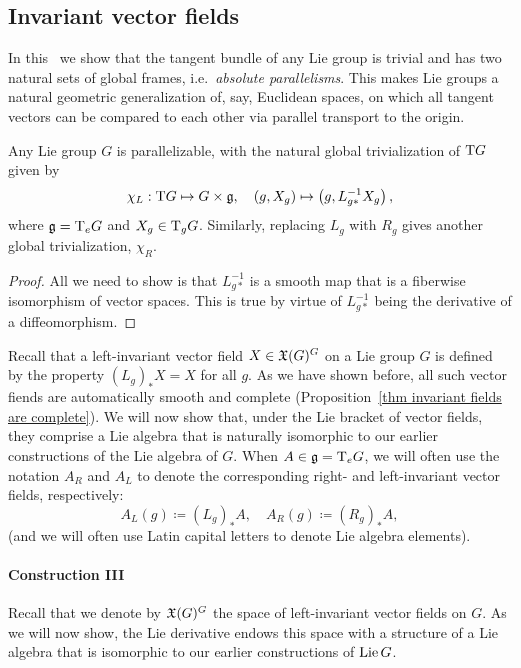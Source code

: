 \subsection{Invariant vector fields}

In this \subsect\ we show that the tangent bundle of any Lie group is trivial and has two natural sets of global frames, i.e.\ \emph{absolute parallelisms}. This makes Lie groups a natural geometric generalization of, say, Euclidean spaces, on which all tangent vectors can be compared to each other via parallel transport to the origin.

\begin{prop}
    Any Lie group $G$ is parallelizable, with the natural global trivialization of $\mathrm{T} G$ given by
    \[\chi_L:\mathrm{T} G\mapsto G\times \mathfrak{g},\quad (g,X_g)\mapsto \left(g, L_{g\ast }^{-1}X_g\right),\]
    where $\mathfrak{g}=\mathrm{T}_e G$ and $X_g\in \mathrm{T}_gG$. Similarly, replacing $L_g$ with $R_g$ gives another global trivialization, $\chi_R$.
\end{prop}
\begin{proof}
    All we need to show is that $L_{g\ast}^{-1}$ is a smooth map that is a fiberwise isomorphism of vector spaces. This is true by virtue of $L_{g\ast}^{-1}$ being the derivative of a diffeomorphism.
\end{proof}

Recall that a left-invariant vector field $X\in\mathfrak{X}(G)^G$ on a Lie group $G$ is defined by the property $(L_g)_\ast X=X$ for all $g$. As we have shown before, all such vector fiends are automatically smooth and complete (Proposition~\ref{thm invariant fields are complete}). We will now show that, under the Lie bracket of vector fields, they comprise a Lie algebra that is naturally isomorphic to our earlier constructions of the Lie algebra of $G$. When $A\in\mathfrak{g}=\mathrm{T}_eG$, we will often use the notation $A_R$ and $A_L$ to denote the corresponding right- and left-invariant vector fields, respectively:
\[A_L(g)\coloneqq (L_g)_\ast A,\quad A_R(g)\coloneqq (R_g)_\ast A,\]
(and we will often use Latin capital letters to denote Lie algebra elements).

\paragraph{Construction III} Recall that we denote by $\mathfrak{X}(G)^G$ the space of left-invariant vector fields on $G$. As we will now show, the Lie derivative endows this space with a structure of a Lie algebra that is isomorphic to our earlier constructions of $\operatorname{Lie} G$.

